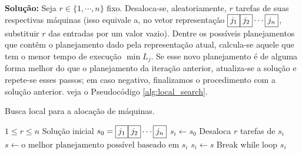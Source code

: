 \noindent \textbf{Solução:}
Seja $r \in \{1, \cdots, n\}$ fixo.
Desaloca-se, aleatoriamente, $r$ tarefas de suas respectivas máquinas (isso equivale a, no vetor representação $\text{\fbox{$j_1$}} \text{\fbox{$j_2$}} \cdots \text{\fbox{$j_n$}}$, substituir $r$ das entradas por um valor vazio).
Dentre os possíveis planejamentos que contêm o planejamento dado pela representação atual, calcula-se aquele que tem o menor tempo de execução $\min L_j$. Se esse novo planejamento é de alguma forma melhor do que o planejamento da iteração anterior, atualiza-se a solução e repete-se esses passos; em caso negativo, finalizamos o procedimento com a solução anterior. veja o Pseudocódigo \autoref{alg:local_search}.

\begin{algorithm}
    \caption{Busca local para a alocação de máquinas.}
    \label{alg:local_search}
    \begin{algorithmic}
        \Require $1 \le r \le n$
        \Require Solução inicial $s_0 = \text{\fbox{$j_1$}} \text{\fbox{$j_2$}} \cdots \text{\fbox{$j_n$}}$
        \State $s_i \gets s_0$
            \State Desaloca $r$ tarefas de $s_i$
            \State $s \gets \text{o melhor planejamento possível baseado em $s_i$}$
                \State $s_i \gets s$
            \Else
                \State Break while loop
            \EndIf
        \EndWhile
        \State \Return $s_i$
    \end{algorithmic}
\end{algorithm}
